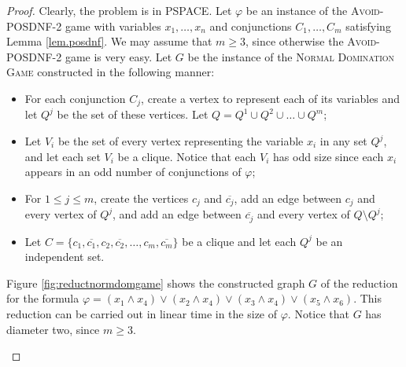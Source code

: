 \documentclass[12pt]{article}
\begin{document}
\begin{proof}
Clearly, the problem is in PSPACE.
Let $\varphi$ be an instance of the \textsc{Avoid-POSDNF-2} game with variables $x_1,\ldots,x_n$ and conjunctions $C_1,\ldots,C_m$ satisfying Lemma \ref{lem.posdnf}.
We may assume that $m\geq 3$, since otherwise the \textsc{Avoid-POSDNF-2} game is very easy.
%
Let $G$ be the instance of the \textsc{Normal Domination Game} constructed in the following manner:

\begin{itemize}
\item For each conjunction $C_j$, create a vertex to represent each of its variables and let $Q^j$ be the set of these vertices. Let $Q = Q^1 \cup Q^2 \cup \ldots \cup Q^m$;
\item Let $V_i$ be the set of every vertex representing the variable $x_i$ in any set $Q^j$, and let each set $V_i$ be a clique. Notice that each $V_i$ has odd size since each $x_i$ appears in an odd number of conjunctions of $\varphi$;
\item For $1\leq j \leq m$, create the vertices $c_j$ and $\overline{c_j}$, add an edge between $c_j$ and every vertex of $Q^j$, and add an edge between $\overline{c_j}$ and every vertex of $Q \setminus Q^j$;
\item Let $C = \{c_1,\overline{c_1},c_2,\overline{c_2},\ldots,c_m,\overline{c_m}\}$ be a clique and let each $Q^j$ be an independent set.
\end{itemize}

Figure \ref{fig:reductnormdomgame} shows the constructed graph $G$ of the reduction for the formula $\varphi = (x_1 \land x_4) \lor (x_2\land x_4) \lor (x_3\land x_4) \lor (x_5 \land x_6)$. This reduction can be carried out in linear time in the size of $\varphi$.
Notice that $G$ has diameter two, since $m\geq 3$.

\begin{figure}
\centering
{}
\end{figure}
\end{proof}
\end{document}
